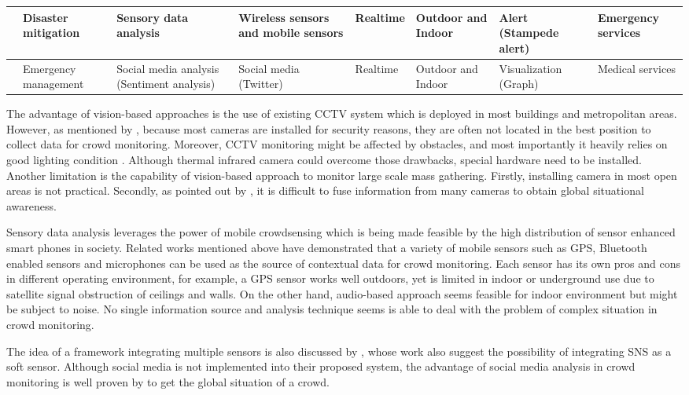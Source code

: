 \begin{center}
\begin{longtable}{|p{1.8cm}|p{2cm}|p{2cm}|p{1.8cm}|p{1.3cm}|p{1.3cm}|}
		\hline
		\citet{Ramesh2014} & Disaster mitigation & Sensory data analysis & Wireless sensors and mobile sensors & Realtime & Outdoor and Indoor & Alert (Stampede alert) & Emergency services \\
		\hline
		\citet{DelirHaghighi2013} & Emergency management & Social media analysis (Sentiment analysis) & Social media (Twitter) & Realtime & Outdoor and Indoor & Visualization (Graph) & Medical services \\
		\hline
	\end{longtable}
\end{center}

The advantage of vision-based approaches is the use of existing CCTV system which is deployed in most buildings and metropolitan areas. However, as mentioned by \citet{Davies1995}, because most cameras are installed for security reasons, they are often not located in the best position to collect data for crowd monitoring. Moreover, CCTV monitoring might be affected by obstacles, and most importantly it heavily relies on good lighting condition \citep{Wirz2012}. Although thermal infrared camera could overcome those drawbacks, special hardware need to be installed. Another limitation is the capability of vision-based approach to monitor large scale mass gathering. Firstly, installing camera in most open areas is not practical. Secondly, as pointed out by \citet{Wirz2012}, it is difficult to fuse information from many cameras to obtain global situational awareness.

Sensory data analysis leverages the power of mobile crowdsensing which is being made feasible by the high distribution of sensor enhanced smart phones in society. Related works mentioned above have demonstrated that a variety of mobile sensors such as GPS, Bluetooth enabled sensors and microphones can be used as the source of contextual data for crowd monitoring. Each sensor has its own pros and cons in different operating environment, for example, a GPS sensor works well outdoors, yet is limited in indoor or underground use due to satellite signal obstruction of ceilings and walls. On the other hand, audio-based approach seems feasible for indoor environment but might be subject to noise. No single information source and analysis technique seems is able to deal with the problem of complex situation in crowd monitoring.

The idea of a framework integrating multiple sensors is also discussed by \citet{Ramesh2014}, whose work also suggest the possibility of integrating SNS as a soft sensor. Although social media is not implemented into their proposed system, the advantage of social media analysis in crowd monitoring is well proven by \citet{DelirHaghighi2013} to get the global situation of a crowd.

